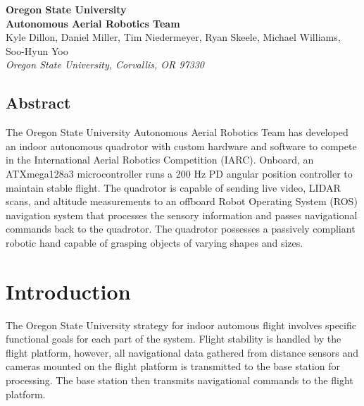 \documentclass[12pt,letterpaper]{article}
\begin{document}
\begin{center}
{
    \bfseries\huge
    Oregon State University \\
    Autonomous Aerial Robotics Team \\ [1cm]
}
{
    \small
    Kyle Dillon, Daniel Miller, Tim Niedermeyer, Ryan Skeele, Michael Williams, Soo-Hyun Yoo \\ \vspace{0.5em}
    \emph{Oregon State University, Corvallis, OR 97330}
}

\end{center}

\begin{center}
\begin{minipage}{5.5in}

\section*{Abstract}

The Oregon State University Autonomous Aerial Robotics Team has developed
an indoor autonomous quadrotor with custom hardware and software to compete
in the International Aerial Robotics Competition (IARC). Onboard, an
ATXmega128a3 microcontroller runs a 200 Hz PD angular position controller
to maintain stable flight. The quadrotor is capable of sending live video,
LIDAR scans, and altitude measurements to an offboard Robot Operating
System (ROS) navigation system that processes the sensory information and
passes navigational commands back to the quadrotor. The quadrotor possesses
a passively compliant robotic hand capable of grasping objects of varying
shapes and sizes.

\end{minipage}
\end{center}


\section*{Introduction}

The Oregon State University strategy for indoor automous flight involves
specific functional goals for each part of the system. Flight stability is
handled by the flight platform, however, all navigational data gathered from
distance sensors and cameras mounted on the flight platform is transmitted to
the base station for processing. The base station then transmits navigational
commands to the flight platform.
\end{document}
